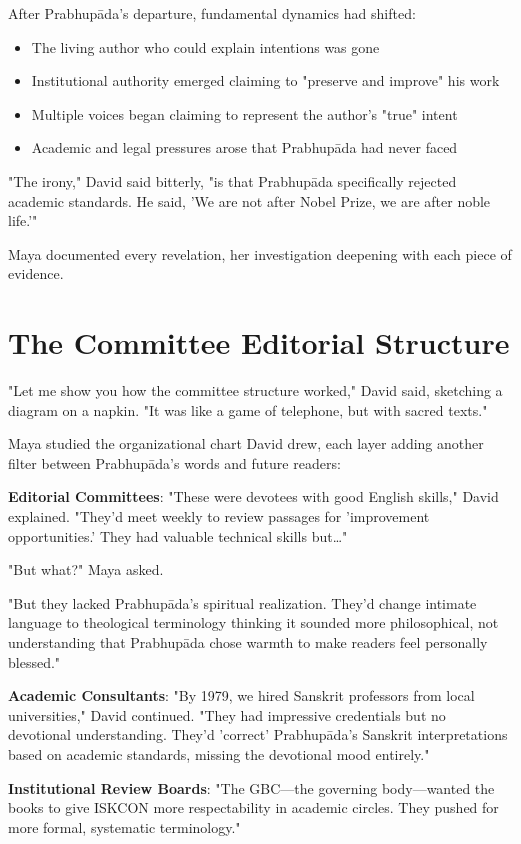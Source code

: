 \documentclass[11pt,twoside]{book}
\begin{document}
After Prabhupāda's departure, fundamental dynamics had shifted:
\begin{itemize}
\item The living author who could explain intentions was gone
\item Institutional authority emerged claiming to "preserve and improve" his work
\item Multiple voices began claiming to represent the author's "true" intent
\item Academic and legal pressures arose that Prabhupāda had never faced
\end{itemize}

"The irony," David said bitterly, "is that Prabhupāda specifically rejected academic standards. He said, 'We are not after Nobel Prize, we are after noble life.'"

Maya documented every revelation, her investigation deepening with each piece of evidence.
\section*{The Committee Editorial Structure}
\label{sec:org9b1ee56}

"Let me show you how the committee structure worked," David said, sketching a diagram on a napkin. "It was like a game of telephone, but with sacred texts."

Maya studied the organizational chart David drew, each layer adding another filter between Prabhupāda's words and future readers:

\textbf{\textbf{Editorial Committees}}: "These were devotees with good English skills," David explained. "They'd meet weekly to review passages for 'improvement opportunities.' They had valuable technical skills but\ldots{}"

"But what?" Maya asked.

"But they lacked Prabhupāda's spiritual realization. They'd change intimate language to theological terminology thinking it sounded more philosophical, not understanding that Prabhupāda chose warmth to make readers feel personally blessed."

\textbf{\textbf{Academic Consultants}}: "By 1979, we hired Sanskrit professors from local universities," David continued. "They had impressive credentials but no devotional understanding. They'd 'correct' Prabhupāda's Sanskrit interpretations based on academic standards, missing the devotional mood entirely."

\textbf{\textbf{Institutional Review Boards}}: "The GBC—the governing body—wanted the books to give ISKCON more respectability in academic circles. They pushed for more formal, systematic terminology."
\end{document}
